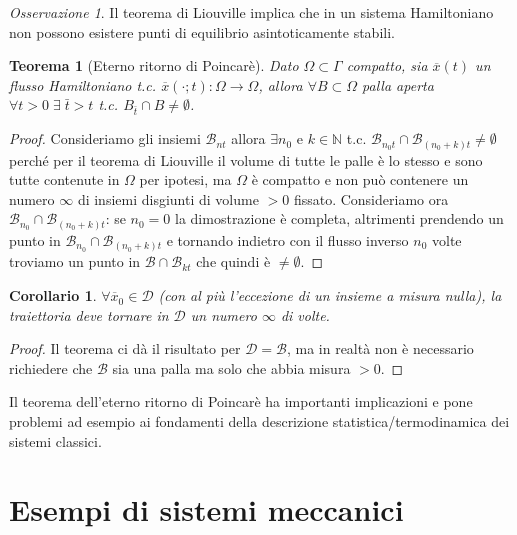 \documentclass{book}
\theoremstyle{plain}
\newtheorem{teo}{Teorema}[chapter]
\theoremstyle{plain}
\theoremstyle{plain}
\theoremstyle{plain}
\newtheorem*{cor}{Corollario}
\theoremstyle{plain}
\theoremstyle{definition}
\theoremstyle{remark}
\newtheorem*{oss}{Osservazione}
\theoremstyle{definition}
\begin{document}
\begin{oss}
    Il teorema di Liouville implica che in un sistema Hamiltoniano non possono esistere punti di equilibrio asintoticamente stabili.
\end{oss}

\begin{teo}[Eterno ritorno di Poincarè]
    Dato $\Omega \subset \Gamma$ compatto, sia $\overline{x}(t)$ un flusso Hamiltoniano t.c. $\overline{x}(\cdot;t): \Omega \to \Omega$, allora $\forall B\subset\Omega$ palla aperta $\forall t>0 \; \exists\;\bar{t}>t$ t.c. $B_{\bar{t}}\cap B \neq \emptyset$.
\end{teo}

\begin{proof}
    Consideriamo gli insiemi $\mathcal{B}_{nt}$ allora $\exists n_0$ e $k\in\mathbb{N}$ t.c. $\mathcal{B}_{n_0t}\cap\mathcal{B}_{(n_0+k)t}\neq\emptyset$ perché per il teorema di Liouville il volume di tutte le palle è lo stesso e sono tutte contenute in $\Omega$ per ipotesi, ma $\Omega$ è compatto e non può contenere un numero $\infty$ di insiemi disgiunti di volume $>0$ fissato. Consideriamo ora $\mathcal{B}_{n_0}\cap\mathcal{B}_{(n_0+k)t}$: se $n_0=0$ la dimostrazione è completa, altrimenti prendendo un punto in $\mathcal{B}_{n_0}\cap\mathcal{B}_{(n_0+k)t}$ e tornando indietro con il flusso inverso $n_0$ volte troviamo un punto in $\mathcal{B}\cap\mathcal{B}_{kt}$ che quindi è $\neq\emptyset$.
\end{proof}

\begin{cor}
    $\forall \overline{x}_0\in\mathcal{D}$ (con al più l'eccezione di un insieme a misura nulla), la traiettoria deve tornare in $\mathcal{D}$ un numero $\infty$ di volte.
\end{cor}

\begin{proof}
    Il teorema ci dà il risultato per $\mathcal{D}=\mathcal{B}$, ma in realtà non è necessario richiedere che $\mathcal{B}$ sia una palla ma solo che abbia misura $>0$.
\end{proof}

\noindent Il teorema dell'eterno ritorno di Poincarè ha importanti implicazioni e pone problemi ad esempio ai fondamenti della descrizione statistica/termodinamica dei sistemi classici.

\chapter{Esempi di sistemi meccanici}
\end{document}
